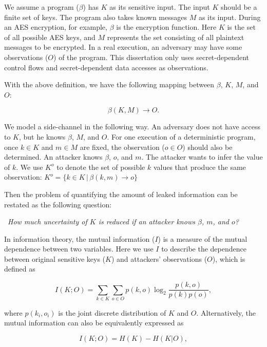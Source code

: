 We assume a program ($\beta$) has $K$ as its sensitive input. The input $K$ should be
a finite set of keys. The program also takes known messages $M$ as its input.
During an AES encryption, for example,
$\beta$ is the encryption function. Here $K$ is the set of all possible AES keys,
and $M$ represents the set consisting of all plaintext messages to be encrypted. In a real execution, an adversary may have
some observations ($O$) of the program. This dissertation only
uses secret-dependent control flows and secret-dependent data
accesses as observations.

With the above definition, we have the following mapping between $\beta$,
$K$, $M$, and $O$:

\begin{displaymath}
    \beta(K, M) \rightarrow O.
\end{displaymath}


We model a side-channel in the following way. An adversary does not have
access to $K$, but he knows $\beta$, $M$, and $O$. For one execution of a
deterministic program, once $k \in K$ and $m \in M$ are fixed, the observation
($o \in O$) should also be determined. An attacker knows $\beta$, $o$,
and $m$. The attacker wants to infer the value of $k$. We use $K^o$ to denote
the set of possible $k$ values that produce the same observation: $K^o = \{ k \in K \, |\, \beta(k, m) \rightarrow o\}$

Then the problem of quantifying the amount of leaked information can be
restated as the following question:

\
\emph{How much uncertainty of $K$ is reduced if an attacker knows $\beta$, $m$, and $o$?}
\

In information theory, the mutual information ($I$) is a measure of the mutual
dependence between two variables. Here we use $I$ to describe the
dependence between original sensitive keys ($K$) and attackers' observations ($O$),
which is defined as

\begin{equation} \label{eq:1}
    I(K;O) = \sum_{k {\in} K}{\sum_{o {\in} O}{p(k, o)\log_2\frac{p(k, o)}{p(k)p(o)}}},
\end{equation}

\noindent where $p(k_i, o_i)$ is the joint discrete distribution of $K$ and $O$.
Alternatively, the mutual information can also be equivalently expressed as

\begin{equation} \label{eq:2}
    I(K;O) = H(K) - H(K|O),
\end{equation}

